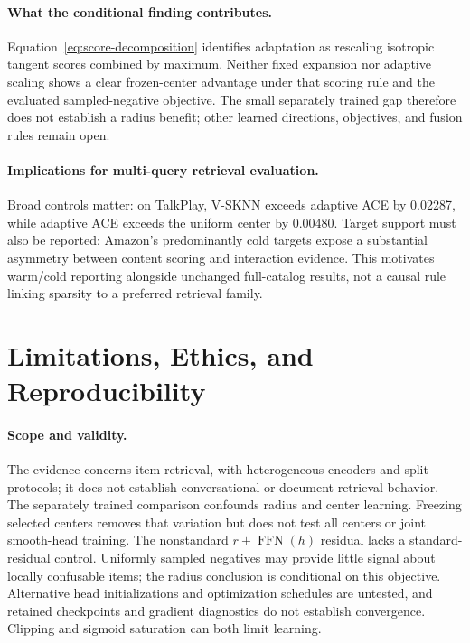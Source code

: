 \documentclass[runningheads]{llncs}
\newcommand{\method}{\textsc{ACE}}
\begin{document}
\paragraph{What the conditional finding contributes.}
Equation~\ref{eq:score-decomposition} identifies adaptation as rescaling
isotropic tangent scores combined by maximum. Neither fixed expansion nor
adaptive scaling shows a clear frozen-center advantage under that scoring rule
and the evaluated sampled-negative objective.
The small separately trained gap therefore does not establish a radius benefit;
other learned directions, objectives, and fusion rules remain open.

\paragraph{Implications for multi-query retrieval evaluation.}
Broad controls matter: on TalkPlay, V-SKNN exceeds adaptive \method{} by 0.02287,
while adaptive \method{} exceeds the uniform center by 0.00480. Target support
must also be reported: Amazon's predominantly cold targets expose a substantial
asymmetry between content scoring and interaction evidence. This motivates
warm/cold reporting alongside unchanged full-catalog results, not a causal
rule linking sparsity to a preferred retrieval family.

\section{Limitations, Ethics, and Reproducibility}
\label{sec:limitations}

\paragraph{Scope and validity.}
The evidence concerns item retrieval, with heterogeneous encoders and split
protocols; it does not establish conversational or document-retrieval behavior.
The separately trained comparison confounds radius and center learning. Freezing
selected centers removes that variation but does not test all centers or joint
smooth-head training. The nonstandard $r+\operatorname{FFN}(h)$ residual lacks
a standard-residual control. Uniformly sampled negatives may provide little
signal about locally confusable items; the radius conclusion is conditional on
this objective. Alternative head initializations and optimization schedules are
untested, and retained checkpoints and gradient diagnostics do not establish
convergence. Clipping and sigmoid saturation can both limit learning.
\end{document}
